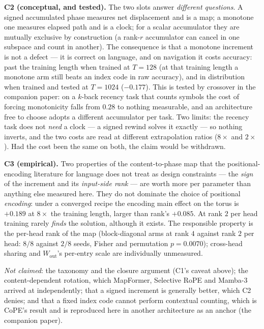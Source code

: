 \documentclass[11pt]{article}
\begin{document}
\textbf{C2 (conceptual, and tested).} The two slots answer \emph{different
questions}. A signed accumulated phase measures net displacement and is a map; a
monotone one measures elapsed path and is a clock; for a scalar accumulator they are
mutually exclusive by construction (a rank-$r$ accumulator can cancel in one subspace
and count in another). The consequence is that a monotone increment is not a defect
--- it is correct on language, and on navigation it costs accuracy: past the training
length when trained at $T=128$ (at that training length a monotone arm still beats an index
code in raw accuracy), and in distribution when trained and tested at $T=1024$ ($-0.177$). This is
tested by crossover in the companion paper: on a $k$-back recency task that counts
symbols the cost of forcing monotonicity falls from $0.28$ to nothing measurable, and
an architecture free to choose adopts a different accumulator per task. Two limits:
the recency task does not \emph{need} a clock --- a signed rewind solves it exactly
--- so nothing inverts, and the two costs are read at different extrapolation ratios
($8\times$ and $2\times$). Had the cost been the same on both, the claim would be
withdrawn.

\textbf{C3 (empirical).} Two properties of the content-to-phase map that the
positional-encoding literature for language does not treat as design constraints ---
the \emph{sign} of the increment and its \emph{input-side rank} --- are worth more per
parameter than anything else measured here. They do not dominate the choice of
positional \emph{encoding}: under a converged recipe the encoding main effect on the
torus is $+0.189$ at $8\times$ the training length, larger than rank's $+0.085$. At
rank $2$ per head training rarely \emph{finds} the solution, although it exists. The
responsible property is the per-head rank of the map (block-diagonal arms at rank $4$
against rank $2$ per head: $8/8$ against $2/8$ seeds, Fisher and permutation
$p=0.0070$); cross-head sharing and $W_{\mathrm{out}}$'s per-entry scale are individually
unmeasured.

\emph{Not claimed}: the taxonomy and the closure argument (C1's caveat above); the
content-dependent rotation, which MapFormer, Selective RoPE and Mamba-3 arrived at
independently; that a signed increment is generally better, which C2 denies; and
that a fixed index code cannot perform contextual counting, which is CoPE's result
and is reproduced here in another architecture as an anchor
(the companion paper).
\end{document}
